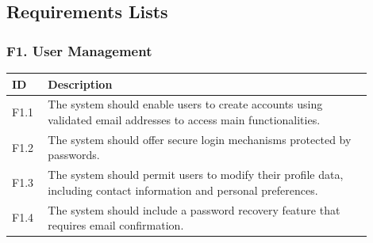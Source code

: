 \subsection{Requirements Lists}
\label{subsec:requirements3}%
\setcounter{req}{1}
\newcommand{\creq}{\thereq\stepcounter{req}}

\subsubsection{F1. User Management}
\begin{center}
    \begin{longtable}{ |l|p{0.9\linewidth}| }
        \hline
        \textbf{ID} & \textbf{Description} \\
        \hline
        F1.1 & The system should enable users to create accounts using validated email addresses to access main functionalities.\\
        \hline
        F1.2 & The system should offer secure login mechanisms protected by passwords. \\
        \hline
        F1.3 & The system should permit users to modify their profile data, including contact information and personal preferences. \\
        \hline
        F1.4 & The system should include a password recovery feature that requires email confirmation. \\
        \hline
    \end{longtable}
\end{center}


